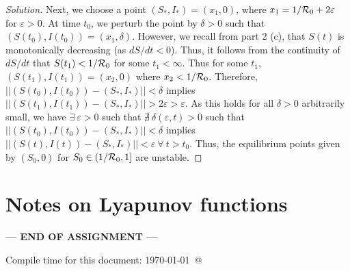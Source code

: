 \documentclass[12pt]{article}
\begin{document}
\begin{enumerate}[(a)]
{\begin{proof}[Solution]
Next, we choose a point $(S_\ast,I_\ast)=(x_1 ,0)$, where $x_1=1/{\cal R}_0 + 2\varepsilon$ for $\varepsilon >0$. At time $t_0$, we perturb the point by $\delta >0$ such that $(S(t_0),I(t_0))=(x_1 ,\delta)$. However, we recall from part 2 (c), that $S(t)$ is monotonically decreasing (as $dS/dt<0$). Thus, it follows from the continuity of $dS/dt$ that $S(t_1) < 1/{\cal R}_0$ for some $t_1 < \infty$. Thus for some $t_1$, $(S(t_1),I(t_1))=(x_2 ,0)$ where $x_2 < 1/{\cal R}_0$. Therefore, $||(S(t_0), I(t_0))-(S_\ast, I_\ast)||<\delta$ implies $||(S(t_1), I(t_1))-(S_\ast, I_\ast)||>2\varepsilon >\varepsilon$.  As this holds for all $\delta>0$ arbitrarily small, we have $\exists \ \varepsilon>0$ such that $\nexists \ \delta(\varepsilon,t)>0$ such that $||(S(t_0), I(t_0))-(S_\ast, I_\ast)||<\delta$ implies $||(S(t), I(t))-(S_\ast, I_\ast)||<\varepsilon \ \forall \ t>t_0$. Thus, the equilibrium points given by $(S_0,0)$ for $S_0 \in \left(1/{\cal R}_0, 1\right]$ are unstable.
\end{proof}
}

\end{enumerate}

\newpage
\section*{Notes on Lyapunov functions}\hypertarget{NotesLyapFuns}{}

\NotesOnLyapunovFunctions




\bigskip

\centerline{\bf--- END OF ASSIGNMENT ---}

\bigskip
Compile time for this document:
\today\ @ \thistime
\end{document}
